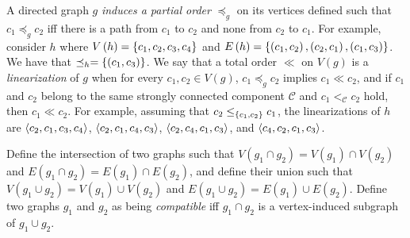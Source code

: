 A directed graph $g$ \emph{induces a partial order} $\preceq_g$ on its vertices defined such that $c_1 \preceq_g c_2$ iff there is a path from $c_1$ to $c_2$ and none from $c_2$ to $c_1$.
For example, consider $h$ where $V\left( h \right)=\left\{c_1,c_2,c_3,c_4\right\}$ and $E\left( h \right)=\left\{\left( c_1,c_2 \right),\left( c_2,c_1 \right),\left( c_1,c_3 \right)\right\}$. 
We have that $\preceq_h = \left\{\left( c_1,c_3 \right)\right\}$.
We say that a total order $\ll$ on $V\left( g \right)$ is a \emph{linearization} of $g$ when for every $c_1,c_2\in V\left( g \right)$, $c_1 \preceq_g c_2$ implies $c_1 \ll c_2$, and if $c_1$ and $c_2$ belong to the same strongly connected component $\mathcal{C}$ and $ c_1 <_{\mathcal{C}} c_2$ hold, then $c_1 \ll c_2$. For example, assuming that $c_2 \leq_{\left\{c_1,c_2\right\}} c_1$, the linearizations of $h$ are $\left\langle c_2,c_1,c_3,c_4\right\rangle$, $\left\langle c_2,c_1,c_4,c_3\right\rangle$, $\left\langle c_2,c_4,c_1,c_3\right\rangle$, and $\left\langle c_4,c_2,c_1,c_3\right\rangle$.

\begin{comment}
We now define a partial order on graphs. If $g_1$ and $g_2$ are two graphs, then we write $g_1 \leq g_2$ iff $V\left( g_1 \right)\subseteq V\left( g_2 \right)$, and if $v\in V\left( g_1 \right)$, $e\in E\left( g_2 \right)$, and $v$ is an endpoint of $e$, then $e\in E\left( g_1 \right)$. 
For example, consider the graphs $h'$ and $h''$ such that $V\left( h' \right)=\aset{c_1,c_2,c_4}$, $E\left( h' \right)=\aset{\left( c_1,c_2 \right),\left( c_2,c_1 \right)}$, $V\left( h'' \right)=\aset{c_1,c_3,c_4}$, and $E\left( h'' \right)=\aset{\left( c_1,c_3 \right)}$. We have that $h'\leq h$, but $ h''\not\leq h$.
\end{comment}

Define the intersection of two graphs such that $V\left( g_1 \cap g_2 \right)=V\left( g_1 \right)\cap V\left( g_2 \right)$ and $E\left( g_1 \cap g_2 \right)= E\left( g_1 \right)\cap E\left( g_2 \right)$, and define their union such that $V\left( g_1 \cup g_2 \right)=V\left( g_1 \right)\cup V\left( g_2 \right)$ and $E\left( g_1 \cup g_2 \right)= E\left( g_1 \right)\cup E\left( g_2 \right)$.
Define two graphs $g_1$ and $g_2$ as being \emph{compatible} iff $g_1 \cap g_2$ is a vertex-induced subgraph of $g_1 \cup g_2$.

